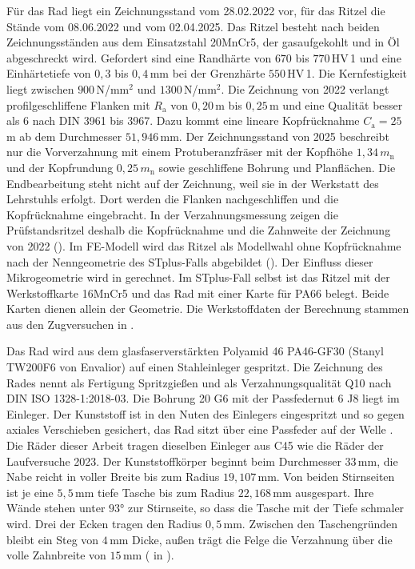 Für das Rad liegt ein Zeichnungsstand vom 28.02.2022 vor, für das Ritzel die Stände vom 08.06.2022 und vom 02.04.2025. Das Ritzel besteht nach beiden Zeichnungsständen aus dem Einsatzstahl 20MnCr5, der gasaufgekohlt und in Öl abgeschreckt wird. Gefordert sind eine Randhärte von $670$ bis $770$\,HV\,1 und eine Einhärtetiefe von $0{,}3$ bis $0{,}4$\,mm bei der Grenzhärte $550$\,HV\,1. Die Kernfestigkeit liegt zwischen $900$\,N/mm$^{2}$ und $1300$\,N/mm$^{2}$. Die Zeichnung von 2022 verlangt profilgeschliffene Flanken mit $R_{\mathrm{a}}$ von $0{,}20$\,\textmu m bis $0{,}25$\,\textmu m und eine Qualität besser als 6 nach DIN 3961 bis 3967. Dazu kommt eine lineare Kopfrücknahme $C_{\mathrm{a}} = 25$\,\textmu m ab dem Durchmesser $51{,}946$\,mm. Der Zeichnungsstand von 2025 beschreibt nur die Vorverzahnung mit einem Protuberanzfräser mit der Kopfhöhe $1{,}34\,m_{\mathrm{n}}$ und der Kopfrundung $0{,}25\,m_{\mathrm{n}}$ sowie geschliffene Bohrung und Planflächen. Die Endbearbeitung steht nicht auf der Zeichnung, weil sie in der Werkstatt des Lehrstuhls erfolgt. Dort werden die Flanken nachgeschliffen und die Kopfrücknahme eingebracht. In der Verzahnungsmessung zeigen die Prüfstandsritzel deshalb die Kopfrücknahme und die Zahnweite der Zeichnung von 2022 (). Im FE-Modell wird das Ritzel als Modellwahl ohne Kopfrücknahme nach der Nenngeometrie des STplus-Falls abgebildet (). Der Einfluss dieser Mikrogeometrie wird in  gerechnet. Im STplus-Fall selbst ist das Ritzel mit der Werkstoffkarte 16MnCr5 und das Rad mit einer Karte für PA66 belegt. Beide Karten dienen allein der Geometrie. Die Werkstoffdaten der Berechnung stammen aus den Zugversuchen in .

Das Rad wird aus dem glasfaserverstärkten Polyamid 46 PA46-GF30 (Stanyl TW200F6 von Envalior) auf einen Stahleinleger gespritzt. Die Zeichnung des Rades nennt als Fertigung Spritzgießen und als Verzahnungsqualität Q10 nach DIN ISO 1328-1:2018-03. Die Bohrung 20 G6 mit der Passfedernut 6 J8 liegt im Einleger. Der Kunststoff ist in den Nuten des Einlegers eingespritzt und so gegen axiales Verschieben gesichert, das Rad sitzt über eine Passfeder auf der Welle \cite[S.~47]{Fie23}. Die Räder dieser Arbeit tragen dieselben Einleger aus C45 wie die Räder der Laufversuche 2023. Der Kunststoffkörper beginnt beim Durchmesser $33$\,mm, die Nabe reicht in voller Breite bis zum Radius $19{,}107$\,mm. Von beiden Stirnseiten ist je eine $5{,}5$\,mm tiefe Tasche bis zum Radius $22{,}168$\,mm ausgespart. Ihre Wände stehen unter $93$° zur Stirnseite, so dass die Tasche mit der Tiefe schmaler wird. Drei der Ecken tragen den Radius $0{,}5$\,mm. Zwischen den Taschengründen bleibt ein Steg von $4$\,mm Dicke, außen trägt die Felge die Verzahnung über die volle Zahnbreite von $15$\,mm ( in ).

